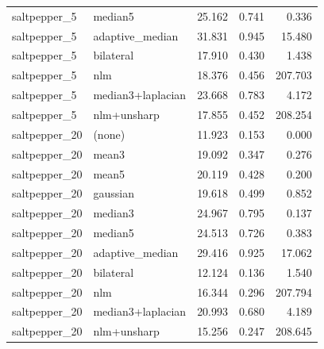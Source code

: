 \begin{tabular}{llrrr}
saltpepper_5 & median5 & 25.162 & 0.741 & 0.336 \\
saltpepper_5 & adaptive_median & 31.831 & 0.945 & 15.480 \\
saltpepper_5 & bilateral & 17.910 & 0.430 & 1.438 \\
saltpepper_5 & nlm & 18.376 & 0.456 & 207.703 \\
saltpepper_5 & median3+laplacian & 23.668 & 0.783 & 4.172 \\
saltpepper_5 & nlm+unsharp & 17.855 & 0.452 & 208.254 \\
saltpepper_20 & (none) & 11.923 & 0.153 & 0.000 \\
saltpepper_20 & mean3 & 19.092 & 0.347 & 0.276 \\
saltpepper_20 & mean5 & 20.119 & 0.428 & 0.200 \\
saltpepper_20 & gaussian & 19.618 & 0.499 & 0.852 \\
saltpepper_20 & median3 & 24.967 & 0.795 & 0.137 \\
saltpepper_20 & median5 & 24.513 & 0.726 & 0.383 \\
saltpepper_20 & adaptive_median & 29.416 & 0.925 & 17.062 \\
saltpepper_20 & bilateral & 12.124 & 0.136 & 1.540 \\
saltpepper_20 & nlm & 16.344 & 0.296 & 207.794 \\
saltpepper_20 & median3+laplacian & 20.993 & 0.680 & 4.189 \\
saltpepper_20 & nlm+unsharp & 15.256 & 0.247 & 208.645 \\
\bottomrule
\end{tabular}
